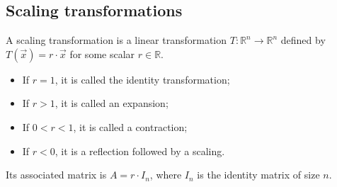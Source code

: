 \subsection{Scaling transformations}
\begin{definition}
    A scaling transformation is a linear transformation $T: \mathbb{R}^n \to \mathbb{R}^n$ defined by $T(\vec{x}) = r \cdot \vec{x}$ for some scalar $r \in \mathbb{R}$.
    \begin{itemize}[itemsep=1pt,label=$\circ$]
        \item If $r = 1$, it is called the identity transformation;
        \item If $r > 1$, it is called an expansion;
        \item If $0 < r < 1$, it is called a contraction;
        \item If $r < 0$, it is a reflection followed by a scaling.
    \end{itemize}
    Its associated matrix is $A = r \cdot I_n$, where $I_n$ is the identity matrix of size $n$.
\end{definition}

